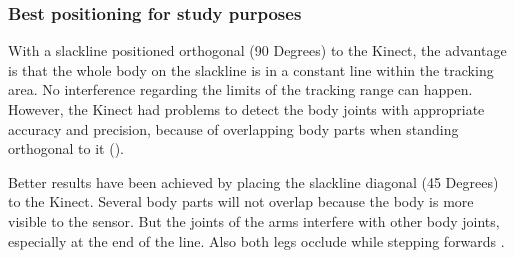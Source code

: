 
\subsubsection{Best positioning for study purposes }

With a slackline positioned orthogonal (90 Degrees) to the Kinect, the advantage is that the whole body on the slackline is in a constant line within the tracking area. No interference regarding the limits of the tracking range can happen. However, the Kinect had problems to detect the body joints with appropriate accuracy and precision, because of overlapping body parts when standing orthogonal to it (\textbf{}).

Better results have been achieved by placing the slackline diagonal (45 Degrees) to the Kinect. Several body parts will not overlap because the body is more visible to the sensor.
But the joints of the arms interfere with other body joints, especially at the end of the line. Also both legs occlude while stepping forwards \textbf{}. 

